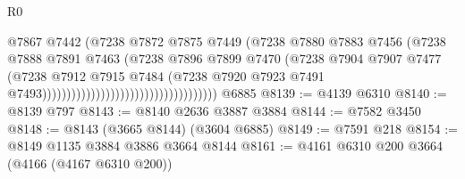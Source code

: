 \begin{lexlean}{R0}
\begin{coremodule}
                                                              @7867
                                                              @7442
                                                              (@7238
                                                                @7872
                                                                @7875
                                                                @7449
                                                                (@7238
                                                                  @7880
                                                                  @7883
                                                                  @7456
                                                                  (@7238
                                                                    @7888
                                                                    @7891
                                                                    @7463
                                                                    (@7238
                                                                      @7896
                                                                      @7899
                                                                      @7470
                                                                      (@7238
                                                                        @7904
                                                                        @7907
                                                                        @7477
                                                                        (@7238
                                                                          @7912
                                                                          @7915
                                                                          @7484
                                                                          (@7238
                                                                            @7920
                                                                            @7923
                                                                            @7491
                                                                            @7493))))))))))))))))))))))))))))))))))))
    @6885
@8139 := @4139 @6310
@8140 := @8139 @797
@8143 := @8140 @2636 @3887 @3884
@8144 := @7582 @3450
@8148 := @8143 (@3665 @8144) (@3604 @6885)
@8149 := @7591 @218
@8154 := @8149 @1135 @3884 @3886 @3664 @8144
@8161 := @4161 @6310 @200 @3664 (@4166 (@4167 @6310 @200))

\end{coremodule}
\end{lexlean}
